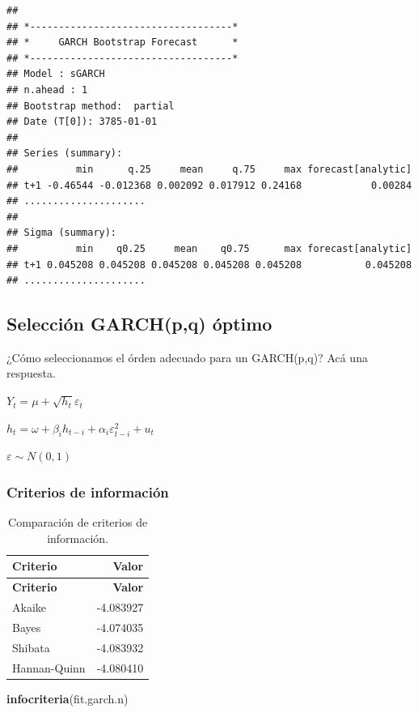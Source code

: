 \documentclass[
]{book}
\newenvironment{Shaded}{\begin{snugshade}}{\end{snugshade}}
\newcommand{\FunctionTok}[1]{\textcolor[rgb]{0.13,0.29,0.53}{\textbf{#1}}}
\newcommand{\NormalTok}[1]{#1}
\begin{document}
\begin{verbatim}
## 
## *-----------------------------------*
## *     GARCH Bootstrap Forecast      *
## *-----------------------------------*
## Model : sGARCH
## n.ahead : 1
## Bootstrap method:  partial
## Date (T[0]): 3785-01-01
## 
## Series (summary):
##          min      q.25     mean     q.75     max forecast[analytic]
## t+1 -0.46544 -0.012368 0.002092 0.017912 0.24168            0.00284
## .....................
## 
## Sigma (summary):
##          min    q0.25     mean    q0.75      max forecast[analytic]
## t+1 0.045208 0.045208 0.045208 0.045208 0.045208           0.045208
## .....................
\end{verbatim}

\hypertarget{selecciuxf3n-garchpq-uxf3ptimo}{%
\subsection{Selección GARCH(p,q) óptimo}\label{selecciuxf3n-garchpq-uxf3ptimo}}

¿Cómo seleccionamos el órden adecuado para un GARCH(p,q)? Acá una respuesta.

\(Y_t = \mu+\sqrt{h_t}\varepsilon_t\)

\(h_t = \omega+\beta_ih_{t-i}+\alpha_i\varepsilon^2_{t-i}+u_t\)

\(\varepsilon \sim N(0,1)\)

\hypertarget{criterios-de-informaciuxf3n}{%
\subsubsection{Criterios de información}\label{criterios-de-informaciuxf3n}}

\begin{longtable}[]{@{}lr@{}}
\caption{\label{tab:info-criteria} Comparación de criterios de información.}\tabularnewline
\toprule\noalign{}
\textbf{Criterio} & \textbf{Valor} \\
\midrule\noalign{}
\endfirsthead
\toprule\noalign{}
\textbf{Criterio} & \textbf{Valor} \\
\midrule\noalign{}
\endhead
\bottomrule\noalign{}
\endlastfoot
Akaike & -4.083927 \\
Bayes & -4.074035 \\
Shibata & -4.083932 \\
Hannan-Quinn & -4.080410 \\
\end{longtable}

\begin{Shaded}
\begin{Highlighting}[]
\FunctionTok{infocriteria}\NormalTok{(fit.garch.n)}
\end{Highlighting}
\end{Shaded}
\end{document}
